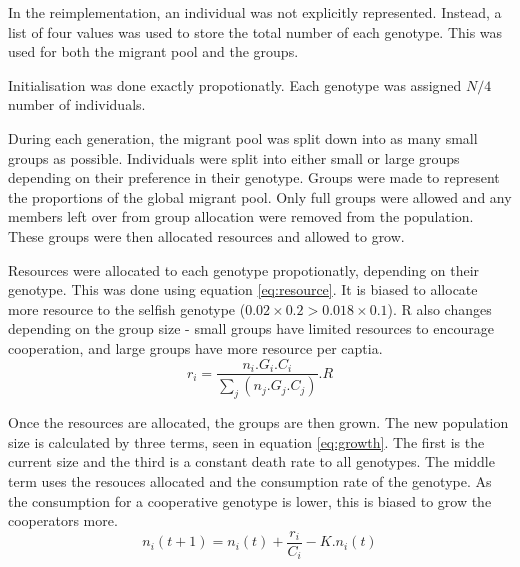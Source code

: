 \documentclass[11pt]{ecsarticle}
\begin{document}
In the reimplementation, an individual was not explicitly represented. 
Instead, a list of four values was used to store the total number of each genotype. 
This was used for both the migrant pool and the groups. 

Initialisation was done exactly propotionatly. Each genotype was assigned $N / 4$ number of individuals.

During each generation, the migrant pool was split down into as many small groups as possible.
Individuals were split into either small or large groups depending on their preference in their genotype.
Groups were made to represent the proportions of the global migrant pool. 
Only full groups were allowed and any members left over from group allocation were removed from the population. 
These groups were then allocated resources and allowed to grow. 

Resources were allocated to each genotype propotionatly, depending on their genotype.
This was done using equation \eqref{eq:resource}. 
It is biased to allocate more resource to the selfish genotype ($0.02 \times 0.2 > 0.018 \times 0.1$). 
R also changes depending on the group size - small groups have limited resources to encourage cooperation, and large groups have more resource per captia.
\begin{equation}
 r_i = \frac{ n_i . G_i . C_i }{\sum\limits_j (n_j . G_j . C_j )} . R 
 \label{eq:resource}
\end{equation}

Once the resources are allocated, the groups are then grown. 
The new population size is calculated by three terms, seen in equation \ref{eq:growth}. 
The first is the current size and the third is a constant death rate to all genotypes.
The middle term uses the resouces allocated and the consumption rate of the genotype.
As the consumption for a cooperative genotype is lower, this is biased to grow the cooperators more.
\begin{equation}
 n_i (t + 1) = n_i (t) + \frac{r_i}{C_i} - K.n_i (t)
 \label{eq:growth}
\end{equation}
\end{document}
